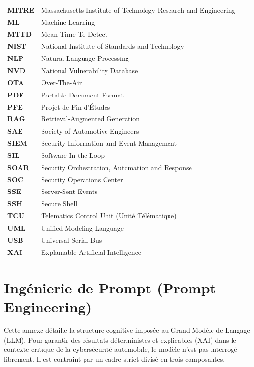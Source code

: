 \documentclass[a4paper, 12pt]{report}
\begin{document}
\begin{tabular}{ll}
\textbf{MITRE} & Massachusetts Institute of Technology Research and Engineering \\
\textbf{ML} & Machine Learning \\
\textbf{MTTD} & Mean Time To Detect \\
\textbf{NIST} & National Institute of Standards and Technology \\
\textbf{NLP} & Natural Language Processing \\
\textbf{NVD} & National Vulnerability Database \\
\textbf{OTA} & Over-The-Air \\
\textbf{PDF} & Portable Document Format \\
\textbf{PFE} & Projet de Fin d'Études \\
\textbf{RAG} & Retrieval-Augmented Generation \\
\textbf{SAE} & Society of Automotive Engineers \\
\textbf{SIEM} & Security Information and Event Management \\
\textbf{SIL} & Software In the Loop \\
\textbf{SOAR} & Security Orchestration, Automation and Response \\
\textbf{SOC} & Security Operations Center \\
\textbf{SSE} & Server-Sent Events \\
\textbf{SSH} & Secure Shell \\
\textbf{TCU} & Telematics Control Unit (Unité Télématique) \\
\textbf{UML} & Unified Modeling Language \\
\textbf{USB} & Universal Serial Bus \\
\textbf{XAI} & Explainable Artificial Intelligence \\
\end{tabular}


\appendix
{}

\chapter{Ingénierie de Prompt (Prompt Engineering)}
\label{annexe:prompt_engineering}

Cette annexe détaille la structure cognitive imposée au Grand Modèle de Langage (LLM). Pour garantir des résultats déterministes et explicables (XAI) dans le contexte critique de la cybersécurité automobile, le modèle n'est pas interrogé librement. Il est contraint par un cadre strict divisé en trois composantes.
\end{document}
